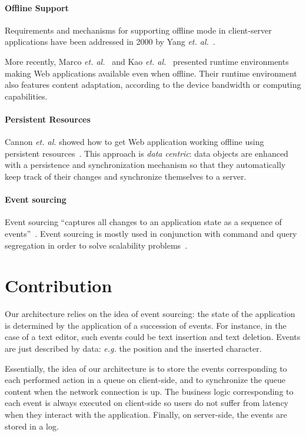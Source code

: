 \documentclass{llncs}
\begin{document}
\paragraph{Offline Support}

Requirements and mechanisms for supporting offline mode in client-server applications have been addressed in 2000 by Yang \emph{et. al.}~\cite{Yang2000_OfflineMode}.

More recently, Marco \emph{et. al.}~\cite{Marco11_InterruptionResilience} and Kao \emph{et. al.}~\cite{Kao12_WOPRE} presented runtime environments making Web applications available even when offline. Their runtime environment also features content adaptation, according to the device bandwidth or computing capabilities.

\paragraph{Persistent Resources}

Cannon \emph{et. al.} showed how to get Web application working offline using persistent resources~\cite{Cannon10_Persistence}. This approach is \emph{data centric}: data objects are enhanced with a persistence and synchronization mechanism so that they automatically keep track of their changes and synchronize themselves to a server.

\cite{Benson10_SyncKit}

\paragraph{Event sourcing}

Event sourcing ``captures all changes to an application state as a sequence of events''~\cite{Fowler05_ES}. Event sourcing is mostly used in conjunction with command and query segregation in order to solve scalability problems~\cite{Betts13_CQRS}.

\section{Contribution}

Our architecture relies on the idea of event sourcing: the state of the application is determined by the application of a succession of events. For instance, in the case of a text editor, such events could be text insertion and text deletion. Events are just described by data: \emph{e.g.} the position and the inserted character.

Essentially, the idea of our architecture is to store the events corresponding to each performed action in a queue on client-side, and to synchronize the queue content when the network connection is up. The business logic corresponding to each event is always executed on client-side so users do not suffer from latency when they interact with the application. Finally, on server-side, the events are stored in a log.
\end{document}
